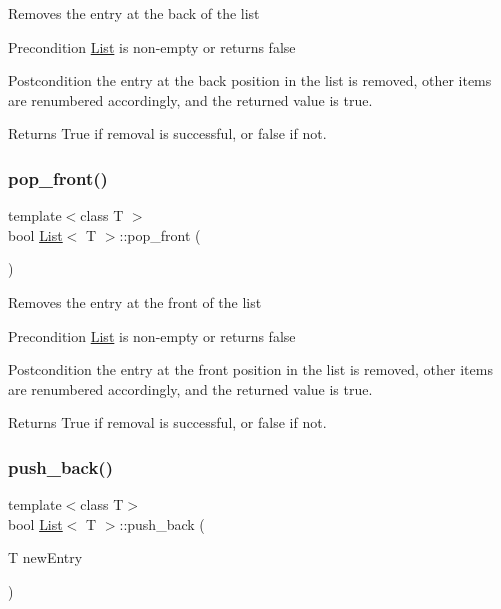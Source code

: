 Removes the entry at the back of the list \begin{DoxyPrecond}{Precondition}
\hyperlink{class_list}{List} is non-\/empty or returns false 
\end{DoxyPrecond}
\begin{DoxyPostcond}{Postcondition}
the entry at the back position in the list is removed, other items are renumbered accordingly, and the returned value is true. 
\end{DoxyPostcond}
\begin{DoxyReturn}{Returns}
True if removal is successful, or false if not. 
\end{DoxyReturn}
\mbox{\label{class_list_a60579fbdaaceccb61aa5d8e33224e045}} 
\subsubsection{\texorpdfstring{pop\+\_\+front()}{pop\_front()}}
{\footnotesize\ttfamily template$<$class T $>$ \\
bool \hyperlink{class_list}{List}$<$ T $>$\+::pop\+\_\+front (\begin{DoxyParamCaption}{ }\end{DoxyParamCaption})}

Removes the entry at the front of the list \begin{DoxyPrecond}{Precondition}
\hyperlink{class_list}{List} is non-\/empty or returns false 
\end{DoxyPrecond}
\begin{DoxyPostcond}{Postcondition}
the entry at the front position in the list is removed, other items are renumbered accordingly, and the returned value is true. 
\end{DoxyPostcond}
\begin{DoxyReturn}{Returns}
True if removal is successful, or false if not. 
\end{DoxyReturn}
\mbox{\label{class_list_adef1cfd54ad3f25eb27acde794e7f279}} 
\subsubsection{\texorpdfstring{push\+\_\+back()}{push\_back()}}
{\footnotesize\ttfamily template$<$class T$>$ \\
bool \hyperlink{class_list}{List}$<$ T $>$\+::push\+\_\+back (\begin{DoxyParamCaption}\item[{T}]{new\+Entry }\end{DoxyParamCaption})}


